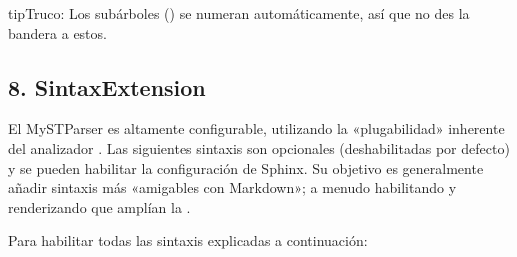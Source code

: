 \documentclass[a4paper,10pt,oneside,spanish,openany]{sphinxmanual}
\begin{document}
\begin{sphinxadmonition}{tip}{Truco:}
\sphinxAtStartPar
Los sub\sphinxhyphen{}árboles () se numeran automáticamente, así que no des la bandera  a estos.
\end{sphinxadmonition}


\subsection{8. Sintax\sphinxhyphen{}Extension}
\label{\detokenize{configuracion_inicial/013.guia_de_myst_parser:sintax-extension}}
\sphinxAtStartPar
El MyST\sphinxhyphen{}Parser es altamente configurable, utilizando la «plugabilidad» inherente del analizador .
Las siguientes sintaxis son opcionales (deshabilitadas por defecto) y se pueden habilitar  la configuración  de Sphinx.
Su objetivo es generalmente añadir sintaxis más «amigables con Markdown»; a menudo habilitando y renderizando  que amplían la .

\sphinxAtStartPar
Para habilitar todas las sintaxis explicadas a continuación:

\begin{sphinxVerbatim}[commandchars=\\\{\}]
  \PYG{p}{[}
\PYG{p}{]}
\end{sphinxVerbatim}
\end{document}
